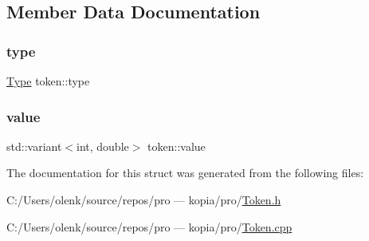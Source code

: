 \subsection{Member Data Documentation}
\mbox{\label{structtoken_a5095946f8d629ebd52196764398077d7}} 
\subsubsection{\texorpdfstring{type}{type}}
{\footnotesize\ttfamily \mbox{\hyperlink{_token_8h_a1d1cfd8ffb84e947f82999c682b666a7}{Type}} token\+::type}

\mbox{\label{structtoken_a669995ca95f73ac9fdee2e5353158dfb}} 
\subsubsection{\texorpdfstring{value}{value}}
{\footnotesize\ttfamily std\+::variant$<$int, double$>$ token\+::value}



The documentation for this struct was generated from the following files\+:\begin{DoxyCompactItemize}
\item 
C\+:/\+Users/olenk/source/repos/pro — kopia/pro/\mbox{\hyperlink{_token_8h}{Token.\+h}}\item 
C\+:/\+Users/olenk/source/repos/pro — kopia/pro/\mbox{\hyperlink{_token_8cpp}{Token.\+cpp}}\end{DoxyCompactItemize}
